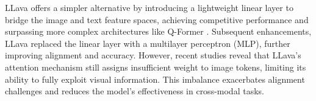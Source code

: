 
LLava offers a simpler alternative by introducing a lightweight linear layer to bridge the image and text feature spaces, achieving competitive performance and surpassing more complex architectures like Q-Former \cite{li2022blip}. Subsequent enhancements, LLava replaced the linear layer with a multilayer perceptron (MLP), further improving alignment and accuracy. However, recent studies \cite{zhang2024redundancy} reveal that LLava's attention mechanism still assigns insufficient weight to image tokens, limiting its ability to fully exploit visual information. This imbalance exacerbates alignment challenges and reduces the model’s effectiveness in cross-modal tasks.


